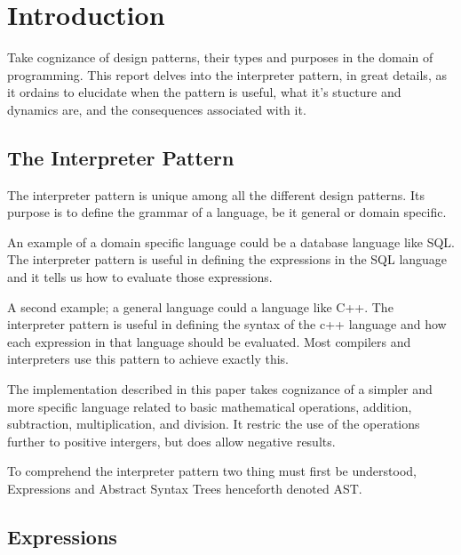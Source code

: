 \section{Introduction}
Take cognizance of design patterns, their types and purposes in the domain of 
programming. This report delves into the interpreter pattern, in great details,
as it ordains to elucidate when the pattern is useful, what it's stucture and
dynamics are, and the consequences associated with it.

\subsection{The Interpreter Pattern}
The interpreter pattern is unique among all the different design patterns.
Its purpose is to define the grammar of a language, be it general or domain
specific. 

An example of a domain specific language could be a database language like
SQL. The interpreter pattern is useful in defining the expressions in the 
SQL language and it tells us how to evaluate those expressions.

A second example; a general language could a language like C++. The interpreter
pattern is useful in defining the syntax of the c++ language and how each expression
in that language should be evaluated. Most compilers and interpreters use this 
pattern to achieve exactly this.

The implementation described in this paper takes cognizance of a simpler and 
more specific language related to basic mathematical operations, addition,
subtraction, multiplication, and division. It restric the use of the operations
further to positive intergers, but does allow negative results.

To comprehend the interpreter pattern two thing must first be understood, Expressions
and Abstract Syntax Trees henceforth denoted AST.

\subsection{Expressions}



\newpage
